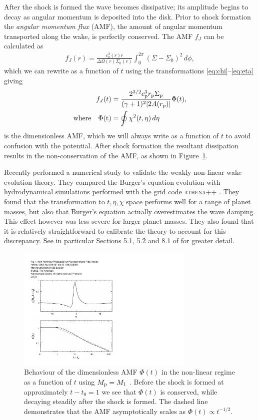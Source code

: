 After the shock is formed the wave becomes dissipative;
its amplitude begins to decay as angular momentum is deposited into the disk.
Prior to shock formation the \textit{angular momentum flux} (AMF), the amount of angular momentum transported along the wake, is perfectly conserved.
The AMF $f_J$ can be calculated as \citep{rafikov2002a}
\begin{align}
    f_J(r) = \frac{c_0^3(r) r}{\Delta\Omega(r)\Sigma_0(r)} \int_0^{2\pi} \left( \Sigma - \Sigma_0 \right)^2 \, d\phi,
\end{align}
which we can rewrite as a function of $t$ using the transformations \eqref{eq:chi}--\eqref{eq:eta} giving
\begin{align}
    f_J(t) &= \frac{2^{3/2} c_{\rm p}^3 r_{\rm p} \Sigma_{\rm p}}{(\gamma + 1)^2 |2 A(r_{\rm p})|} \Phi(t), \\
    \rm{where} \quad \Phi(t) &= \oint \chi^2(t,\eta) \, d\eta 
\end{align}
is the dimensionless AMF, which we will always write as a function of $t$ to avoid confusion with the potential.
After shock formation the resultant dissipation results in the non-conservation of the AMF, as shown in Figure~\ref{fig:AMF}.

Recently \citet{cimerman2021} performed a numerical study to validate the weakly non-linear wake evolution theory.
They compared the Burger's equation evolution with hydrodynamical simulations performed with the grid code \textsc{athena++} \citep{stone2020}.
They found that the transformation to $t,\eta,\chi$ space performs well for a range of planet masses, but also that Burger's equation actually overestimates the wave damping.
This effect however was less severe for larger planet masses.
They also found that it is relatively straightforward to calibrate the theory to account for this discrepancy.
See in particular Sections 5.1, 5.2 and 8.1 of \citet{cimerman2021} for greater detail.
\begin{figure}
    \centering
    \includegraphics[width = 0.75\textwidth]{figures/AMF_burgers.pdf}
    \caption{Behaviour of the dimensionless AMF $\Phi(t)$ in the non-linear regime as a function of $t$ using $M_{\rm p} = M_1$ \citep[solid line;][]{rafikov2002a}.
    Before the shock is formed at approximately $t-t_0=1$ we see that $\Phi(t)$ is conserved, while decaying steadily after the shock is formed.
    The dashed line demonstrates that the AMF asymptotically scales as $\Phi(t) \propto t^{-1/2}$.
    }
    \label{fig:AMF}
\end{figure}

